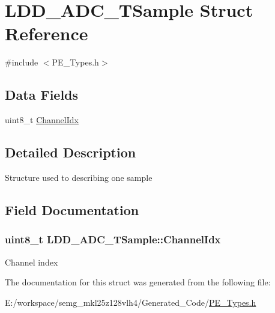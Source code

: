 \hypertarget{struct_l_d_d___a_d_c___t_sample}{\section{L\-D\-D\-\_\-\-A\-D\-C\-\_\-\-T\-Sample Struct Reference}
\label{struct_l_d_d___a_d_c___t_sample}
}


{\ttfamily \#include $<$P\-E\-\_\-\-Types.\-h$>$}

\subsection*{Data Fields}
\begin{DoxyCompactItemize}
\item 
uint8\-\_\-t \hyperlink{struct_l_d_d___a_d_c___t_sample_ae2737bdf799311a9bc9f7acf30f569c1}{Channel\-Idx}
\end{DoxyCompactItemize}


\subsection{Detailed Description}
Structure used to describing one sample 

\subsection{Field Documentation}
\hypertarget{struct_l_d_d___a_d_c___t_sample_ae2737bdf799311a9bc9f7acf30f569c1}{
\subsubsection[{Channel\-Idx}]{\setlength{\rightskip}{0pt plus 5cm}uint8\-\_\-t L\-D\-D\-\_\-\-A\-D\-C\-\_\-\-T\-Sample\-::\-Channel\-Idx}}\label{struct_l_d_d___a_d_c___t_sample_ae2737bdf799311a9bc9f7acf30f569c1}
Channel index 

The documentation for this struct was generated from the following file\-:\begin{DoxyCompactItemize}
\item 
E\-:/workspace/semg\-\_\-mkl25z128vlh4/\-Generated\-\_\-\-Code/\hyperlink{_p_e___types_8h}{P\-E\-\_\-\-Types.\-h}\end{DoxyCompactItemize}
